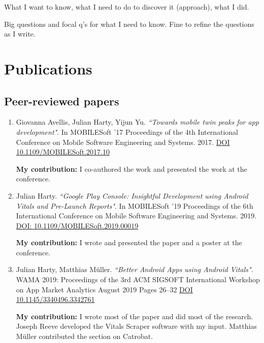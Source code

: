 What I want to know, what I need to do to discover it (approach), what I did.


Big questions and focal q's for what I need to know. Fine to refine the questions as I write.

\clearpage

\section{Publications}
\subsection{Peer-reviewed papers}
\begin{enumerate}
    \item 	Giovanna Avellis, Julian Harty, Yijun Yu. \emph{``Towards mobile twin peaks for app development"}. In MOBILESoft '17 Proceedings of the 4th International Conference on Mobile Software Engineering and Systems. 2017. \href{https://doi.org/10.1109/MOBILESoft.2017.10}{DOI 10.1109/MOBILESoft.2017.10}~\cite{avellis_harty_yu_towards_mobile_twin_peaks}
    
    \textbf{My contribution:} I co-authored the work and presented the work at the conference.
    \item Julian Harty. \emph{``Google Play Console: Insightful Development using Android Vitals and Pre-Launch Reports"}. In MOBILESoft '19 Proceedings of the 6th International Conference on Mobile Software Engineering and Systems. 2019. \href{https://doi.org/10.1109/MOBILESoft.2019.00019}{DOI: 10.1109/MOBILESoft.2019.00019} ~\cite{harty_google_play_console_insightful_development_using_android_vitals_and_pre_launch_reports}
    
    \textbf{My contribution:} I wrote and presented the paper and a poster at the conference.
    
    \item Julian Harty, Matthias Müller. \emph{``Better Android Apps using Android Vitals"}.  WAMA 2019: Proceedings of the 3rd ACM SIGSOFT International Workshop on App Market Analytics August 2019 Pages 26–32 \href{https://doi.org/10.1145/3340496.3342761}{DOI 10.1145/3340496.3342761}~\cite{harty_better_android_apps_using_android_vitals}
    
    \textbf{My contribution:} I wrote most of the paper and did most of the research. Joseph Reeve developed the Vitals Scraper software with my input. Matthias Müller contributed the section on Catrobat.
    

\end{enumerate}
